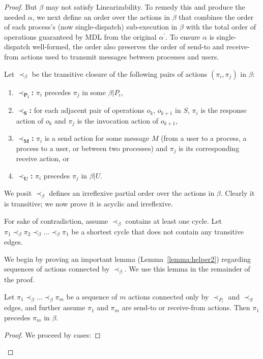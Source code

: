 \begin{proof}
  But $\beta$ may not satisfy Linearizability. To remedy this and produce the needed $\alpha$, we next define an order over the actions in $\beta$ that combines the order of each process’s (now single-dispatch) sub-execution in $\beta$ with the total order of operations guaranteed by MDL from the original $\alpha^\prime$. To ensure $\alpha$ is single-dispatch well-formed, the order also preserves the order of send-to and receive-from actions used to transmit messages between processes and users.

  Let $\prec_\beta$ be the transitive closure of the following pairs of actions $(\pi_i, \pi_j)$ in $\beta$:
  \begin{enumerate}
      \item $\mathbf{\prec_{P_i}}$\textbf{:} $\pi_i$ precedes $\pi_j$ in some $\beta | P_i$,
      \item $\mathbf{\prec_S}$\textbf{:} for each adjacent pair of operations $o_k$, $o_{k+1}$ in $S$, $\pi_i$ is the response action of $o_k$ and $\pi_j$ is the invocation action of $o_{k+1}$,
      \item $\mathbf{\prec_M}$\textbf{:} $\pi_i$ is a send action for some message $M$ (from a user to a process, a process to a user, or between two processes) and $\pi_j$ is its corresponding receive action, or
      \item $\mathbf{\prec_U}$\textbf{:} $\pi_i$ precedes $\pi_j$ in $\beta | U$.
  \end{enumerate}

  We posit $\prec_\beta$ defines an irreflexive partial order over the actions in $\beta$. Clearly it is transitive; we now prove it is acyclic and irreflexive.

  For sake of contradiction, assume $\prec_\beta$ contains at least one cycle. Let $\pi_1 \prec_\beta \pi_2 \prec_\beta \ldots \prec_\beta \pi_1$ be a shortest cycle that does not contain any transitive edges.

  We begin by proving an important lemma (Lemma~\ref{lemma:helper2}) regarding sequences of actions connected by $\prec_\beta$. We use this lemma in the remainder of the proof.

  \begin{lem}
    Let $\pi_1 \prec_\beta \ldots \prec_\beta \pi_m$ be a sequence of $m$ actions connected only by $\prec_{P_i}$ and $\prec_S$ edges, and further assume $\pi_1$ and $\pi_m$ are send-to or receive-from actions. Then $\pi_1$ precedes $\pi_m$ in $\beta$.
    \label{lemma:helper1}
  \end{lem}
  \begin{proof}
      We proceed by cases:


\end{proof}
\end{proof}

